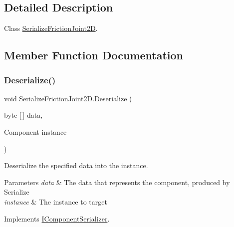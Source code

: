 \subsection{Detailed Description}
Class \hyperlink{class_serialize_friction_joint2_d}{Serialize\+Friction\+Joint2D}. 



\subsection{Member Function Documentation}
\mbox{\label{class_serialize_friction_joint2_d_a54d659c051702c28e03ab1d9cb938605}} 
\subsubsection{\texorpdfstring{Deserialize()}{Deserialize()}}
{\footnotesize\ttfamily void Serialize\+Friction\+Joint2\+D.\+Deserialize (\begin{DoxyParamCaption}\item[{byte \mbox{[}$\,$\mbox{]}}]{data,  }\item[{Component}]{instance }\end{DoxyParamCaption})\hspace{0.3cm}{\ttfamily [inline]}}



Deserialize the specified data into the instance. 


\begin{DoxyParams}{Parameters}
{\em data} & The data that represents the component, produced by Serialize\\
\hline
{\em instance} & The instance to target\\
\hline
\end{DoxyParams}


Implements \hyperlink{interface_i_component_serializer_a4cc366a5c78b33d47a90c209d8fed883}{I\+Component\+Serializer}.

\mbox{\label{class_serialize_friction_joint2_d_a6063f9c73da7ddac92e9da48628f17c1}} 
